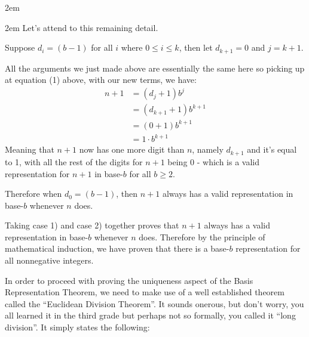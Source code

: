 \documentclass{article}
\newenvironment{jprIn}{\begin{adjustwidth}{2em}{}}{\end{adjustwidth}}
\begin{document}
\begin{jprIn}
\begin{jprIn}
Let's attend to this remaining detail.

Suppose $d_i=(b-1)$ for all $i$ where $0\le{}i\le{}k$, then let $d_{k+1}=0$ and $j=k+1$.

All the arguments we just made above are essentially the same here so picking up at equation (1) above, with our new terms, we have:
\begin{align*}
n+1 &=(d_j+1)b^j\\
&=(d_{k+1}+1)b^{k+1}\\
&=(0+1)b^{k+1}\\
&=1\cdot{}b^{k+1}
\end{align*}
Meaning that $n+1$ now has one more digit than $n$, namely $d_{k+1}$ and it's equal to 1,
with all the rest of the digits for $n+1$ being 0 - which is a valid representation for $n+1$ in base-$b$ for all $b\ge2$.

Therefore when $d_0=(b-1)$, then $n+1$ always has a valid representation in base-$b$ whenever $n$ does.
\end{jprIn}
Taking case 1) and case 2) together proves that $n+1$ always has a valid representation in base-$b$ whenever $n$ does.
Therefore 
by the principle of mathematical induction,
we have proven that there is a base-$b$ representation for all nonnegative integers.
\end{jprIn}
\bigskip

In order to proceed
with proving the uniqueness aspect of the Basis Representation Theorem, we
need to make use of a well established theorem
called the ``Euclidean Division Theorem''.
It sounds onerous, but don’t worry, you all learned it
in the third grade but perhaps not so formally, you called it ``long division''. It simply states the following:

\break
\end{document}
